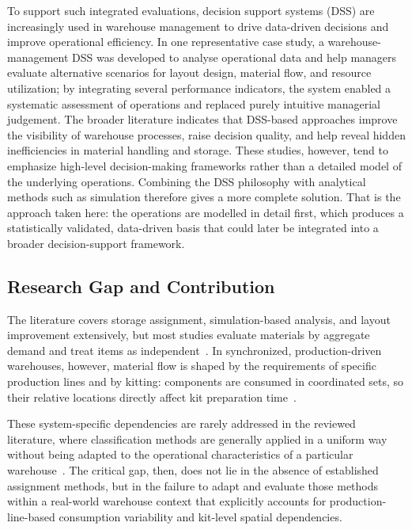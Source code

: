 \documentclass[12pt,a4paper]{article}
\begin{document}
To support such integrated evaluations, decision support systems (DSS) are
increasingly used in warehouse management to drive data-driven decisions and
improve operational efficiency. In one representative case study, a
warehouse-management DSS was developed to analyse operational data and help
managers evaluate alternative scenarios for layout design, material flow, and
resource utilization; by integrating several performance indicators, the
system enabled a systematic assessment of operations and replaced purely
intuitive managerial judgement. The broader literature indicates that
DSS-based approaches improve the visibility of warehouse processes, raise
decision quality, and help reveal hidden inefficiencies in material handling
and storage. These studies, however, tend to emphasize high-level
decision-making frameworks rather than a detailed model of the underlying
operations. Combining the DSS philosophy with analytical methods such as
simulation therefore gives a more complete solution. That is the approach
taken here: the operations are modelled in detail first, which produces a
statistically validated, data-driven basis that could later be integrated into
a broader decision-support framework.

\subsection{Research Gap and Contribution}
The literature covers storage assignment, simulation-based analysis, and
layout improvement extensively, but most studies evaluate materials by
aggregate demand and treat items as independent~\cite{gu2007,limere2012}. In
synchronized, production-driven warehouses, however, material flow is shaped
by the requirements of specific production lines and by kitting: components
are consumed in coordinated sets, so their relative locations directly affect
kit preparation time~\cite{hanson2012,petersen2004}.

These system-specific dependencies are rarely addressed in the reviewed
literature, where classification methods are generally applied in a uniform
way without being adapted to the operational characteristics of a particular
warehouse~\cite{hausman1976,roodbergen2009}. The critical gap, then, does not
lie in the absence of established assignment methods, but in the failure to
adapt and evaluate those methods within a real-world warehouse context that
explicitly accounts for production-line-based consumption variability and
kit-level spatial dependencies.
\end{document}
